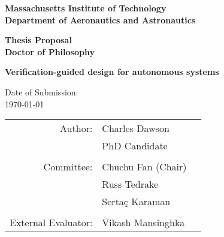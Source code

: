 
\begin{center}
	{\LARGE\bf Massachusetts Institute of Technology \\
		\vspace{0.25\baselineskip}
		Department of Aeronautics and Astronautics}
	\vspace{\baselineskip}

	{\Large\bf Thesis Proposal \\
		\vspace{0.25\baselineskip}
		Doctor of Philosophy}
	\vspace{4\baselineskip}

	\vspace{2\baselineskip}
	{\LARGE\bf Verification-guided design for autonomous systems}
	\vspace{3\baselineskip}

	Date of Submission: \\
	\vspace{0.5\baselineskip}
	\today

	\vspace{8\baselineskip}

	\begin{tabular}{rlc}
		{\small \sc Author:}
		 & Charles Dawson     & \\
		 & PhD Candidate      & \\
		\\ %
		{\small \sc Committee:}
		 & Chuchu Fan (Chair) & \\
		 & Russ Tedrake       & \\
		 & Serta\c c Karaman  & \\
		\\ %
		{\small \sc External Evaluator:}
		 & Vikash Mansinghka  & \\
	\end{tabular}
\end{center}

